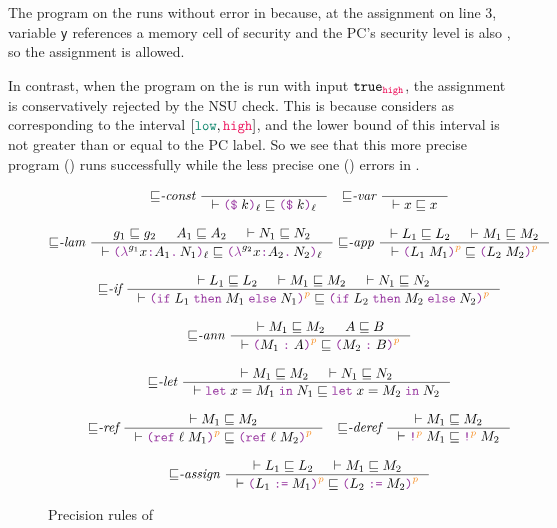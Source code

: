 \noindent The program on the  runs without error in \GSLRef
because, at the assignment on line 3, variable \texttt{y} references a memory
cell of \high security and the PC's security level is also \high, so the
assignment is allowed.

In contrast, when the program on the  is run with input
$\true_{\high}$, the assignment is conservatively rejected by the NSU check.
This is because \GSLRef considers \unk as corresponding to the interval $[\low,
  \high]$, and the lower bound of this interval is not greater than or equal to
the \high PC label. So we see that this more precise program ()
runs successfully while the less precise one () errors in \GSLRef.

\begin{figure}[tbp]
  \raggedright
  {\small
  \begin{gather*}
    {\sqsubseteq}\textit{-const}~
    \inference{}{\vdash \const{k}{\ell} \sqsubseteq \const{k}{\ell}}
    \quad
    {\sqsubseteq}\textit{-var}~
    \inference{}{\vdash x \sqsubseteq x}
    \\[2ex]
    {\sqsubseteq}\textit{-lam}~
    \inference{g_1 \sqsubseteq g_2 & A_1 \sqsubseteq A_2 & \vdash N_1 \sqsubseteq N_2 }
              {\vdash \lam{g_1}{x}{A_1}{N_1}{\ell} \sqsubseteq \lam{g_2}{x}{A_2}{N_2}{\ell}}
    \;
    {\sqsubseteq}\textit{-app}~
    \inference{\vdash L_1 \sqsubseteq L_2 & \vdash M_1 \sqsubseteq M_2}
              {\vdash \app{L_1}{M_1}{p} \sqsubseteq \app{L_2}{M_2}{p}}
    \\[2ex]
    {\sqsubseteq}\textit{-if}~
    \inference{\vdash L_1 \sqsubseteq L_2 & \vdash M_1 \sqsubseteq M_2 & \vdash N_1 \sqsubseteq N_2}
              {\vdash \ifexp{L_1}{M_1}{N_1}{p} \sqsubseteq \ifexp{L_2}{M_2}{N_2}{p}}
    \\[2ex]
    {\sqsubseteq}\textit{-ann}~
    \inference{\vdash M_1 \sqsubseteq M_2 & A \sqsubseteq B}
              {\vdash \ann{M_1}{A}{p} \sqsubseteq \ann{M_2}{B}{p}}
    \\[2ex]
    {\sqsubseteq}\textit{-let}~
    \inference{\vdash M_1 \sqsubseteq M_2 & \vdash N_1 \sqsubseteq N_2}
              {\vdash \letexp{x}{M_1}{N_1} \sqsubseteq \letexp{x}{M_2}{N_2}}
    \\[2ex]
    {\sqsubseteq}\textit{-ref}~
    \inference{\vdash M_1 \sqsubseteq M_2}
              {\vdash \refexp{\ell}{M_1}{p} \sqsubseteq \refexp{\ell}{M_2}{p}}
    \quad
    {\sqsubseteq}\textit{-deref}~
    \inference{\vdash M_1 \sqsubseteq M_2}
              {\vdash \deref{M_1}{p} \sqsubseteq \deref{M_2}{p}}
    \\[2ex]
    {\sqsubseteq}\textit{-assign}~
    \inference{\vdash L_1 \sqsubseteq L_2 & \vdash M_1 \sqsubseteq M_2}
              {\vdash \assign{L_1}{M_1}{p} \sqsubseteq \assign{L_2}{M_2}{p}}
  \end{gather*}}
  \caption{Precision rules of \Surface}
  \label{fig:surface-precision}
\end{figure}

